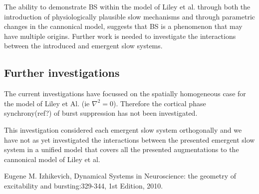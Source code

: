 \documentclass[a4paper,12pt]{article}
\begin{document}
The ability to demonstrate BS within the model of Liley et al. through both the introduction of physiologically
plausible slow mechanisms and through parametric changes in the cannonical model, suggests that BS is a phenomenon that may have multiple origins. Further work is needed to investigate the interactions
between the introduced and emergent slow systems.

\subsection{Further investigations}
The current investigations have focussed on the spatially homogeneous case for the model of Liley et Al. (ie $\nabla^2 =
0$). Therefore the cortical phase synchrony(ref?) of burst suppression has not been investigated.

This investigation considered each emergent slow system orthogonally and we have not as yet investigated the
interactions between the presented emergent slow system in a unified model that covers all the presented augmentations to the cannonical model of Liley et al.


\begin{thebibliography}{999}

  Eugene M. Izhikevich,
  Dynamical Systems in Neuroscience: the geometry of excitability and bursting:329-344,
  1st Edition,
  2010.

\end{thebibliography}
\end{document}
